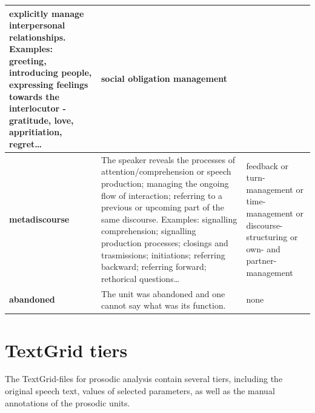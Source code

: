 \documentclass[a4paper,oneside,12pt]{article}
\begin{document}
\begin{longtable}{|l|p{6cm}|p{4cm}|}
{      explicitly manage interpersonal relationships. Examples:
      greeting, introducing people, expressing feelings towards
      the interlocutor - gratitude, love, appritiation, regret…}
                                                       & {social obligation management}   \\
  \hline
  \textbf{metadiscourse}                               & {The speaker reveals
      the processes of attention/comprehension or speech
      production; managing the ongoing flow of interaction;
      referring to a previous or upcoming part of the same
      discourse. Examples: signalling comprehension; signalling
      production processes; closings and trasmissions;
      initiations; referring backward; referring forward;
  rethorical questions…}                               & {feedback or
      turn-management or time-management or discourse-structuring
      or own- and partner-management}
  \\
  \hline
  \textbf{abandoned}                                   & {The unit was
  abandoned and one cannot say what was its function.} &
  {none}                                                                                  \\ \hline
\end{longtable}
\section{TextGrid tiers}

The TextGrid-files for prosodic analysis contain several tiers, including the
original speech text, values of selected parameters, as well as the manual
annotations of the prosodic units.
\end{document}
